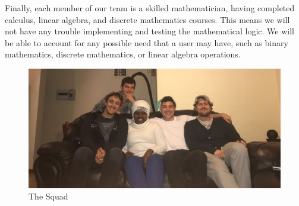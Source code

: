 \documentclass[12pt]{article}
\begin{document}
    Finally, each member of our team is a skilled mathematician, having completed calculus, linear algebra, and discrete mathematics courses.
    This means we will not have any trouble implementing and testing the mathematical logic. We will be able to account for any possible need
    that a user may have, such as binary mathematics, discrete mathematics, or linear algebra operations.\\
    \begin{figure}[htb]
	\centering
	\includegraphics[width=\textwidth]{../Common/team.jpg}
	\caption{The Squad}
	\end{figure}
\end{document}
